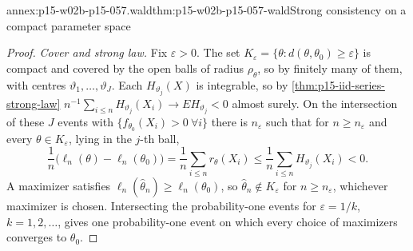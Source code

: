 \begin{annexitem}{annex:p15-w02b-p15-057.wald}{thm:p15-w02b-p15-057-wald}{Strong consistency on a compact parameter space}
\begin{proof}
\emph{Cover and strong law.} Fix \(\varepsilon>0\). The set
\(K_\varepsilon=\{\theta:d(\theta,\theta_0)\geq\varepsilon\}\) is compact
and covered by the open balls of radius \(\rho_\theta\), so by finitely
many of them, with centres \(\vartheta_1,\ldots,\vartheta_J\). Each
\(H_{\vartheta_j}(X)\) is integrable, so by
\cref{thm:p15-iid-series-strong-law}
\(n^{-1}\sum_{i\leq n}H_{\vartheta_j}(X_i)\to EH_{\vartheta_j}<0\) almost
surely. On the intersection of these \(J\) events with
\(\{f_{\theta_0}(X_i)>0\ \forall i\}\) there is \(n_\varepsilon\) such that
for \(n\geq n_\varepsilon\) and every \(\theta\in K_\varepsilon\), lying in
the \(j\)-th ball,
\[
 \frac1n\bigl(\ell_n(\theta)-\ell_n(\theta_0)\bigr)
 =\frac1n\sum_{i\leq n}r_\theta(X_i)
 \leq\frac1n\sum_{i\leq n}H_{\vartheta_j}(X_i)<0 .
\]
A maximizer satisfies \(\ell_n(\widehat\theta_n)\geq\ell_n(\theta_0)\),
so \(\widehat\theta_n\notin K_\varepsilon\) for \(n\geq n_\varepsilon\),
whichever maximizer is chosen. Intersecting the probability-one events for
\(\varepsilon=1/k\), \(k=1,2,\ldots\), gives one probability-one event on
which every choice of maximizers converges to \(\theta_0\).
\end{proof}
\end{annexitem}

